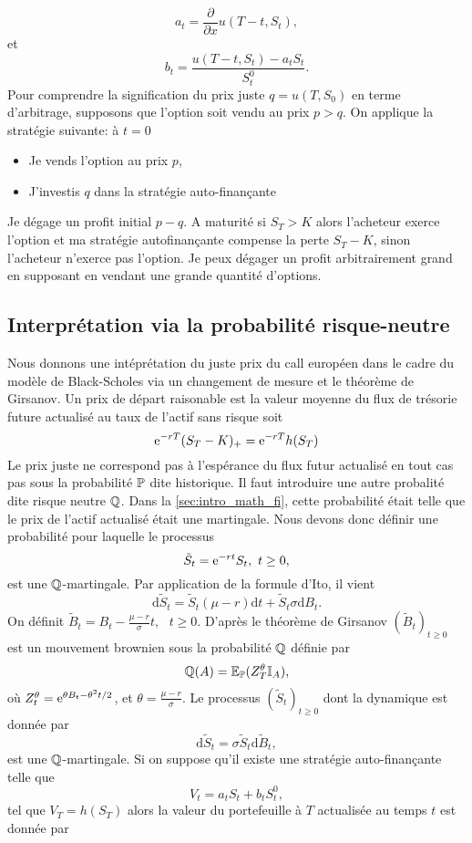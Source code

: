 $$
a_t = \frac{\partial}{\partial x}u(T-t, S_t),
$$
et 
$$
b_t = \frac{u(T-t, S_t) - a_t S_t}{S^0_t}.
$$
Pour comprendre la signification du prix juste $q = u(T, S_0)$ en terme d'arbitrage, supposons que l'option soit vendu au prix $p>q$. On applique la stratégie suivante: à $t=0$
\begin{itemize}
    \item Je vends l'option au prix $p$, 
    \item J'investis $q$ dans la stratégie auto-finançante
\end{itemize}
Je dégage un profit initial $p-q$. A maturité si $S_T> K$ alors l'acheteur exerce l'option et ma stratégie autofinançante compense la perte $S_T-K$, sinon l'acheteur n'exerce pas l'option. Je peux dégager un profit arbitrairement grand en supposant en vendant une grande quantité d'options.
\subsection{Interprétation via la probabilité risque-neutre}
Nous donnons une intéprétation du juste prix du call européen dans le cadre du modèle de Black-Scholes via un changement de mesure et le théorème de Girsanov. Un prix de départ raisonable est la valeur moyenne du flux de trésorie future actualisé au taux de l'actif sans risque soit
$$
\mathrm{e}^{-rT}(S_T - K)_+ = \mathrm{e}^{-rT}h(S_T)
$$
Le prix juste ne correspond pas à l'espérance du flux futur actualisé en tout cas pas sous la probabilité $\mathbb{P}$ dite historique. Il faut introduire une autre probalité dite risque neutre $\mathbb{Q}$. Dans la \cref{sec:intro_math_fi}, cette probabilité était telle que le prix de l'actif actualisé était une martingale. Nous devons donc définir une probabilité pour laquelle le processus 
$$
\tilde{S}_t = \mathrm{e}^{-rt}S_t,\text{ }t\geq 0,
$$
est une $\mathbb{Q}$-martingale. Par application de la formule d'Ito, il vient 
$$
\text{d}\tilde{S}_t = \tilde{S}_t (\mu- r)\text{d}t + \tilde{S}_t \sigma\text{d}B_t.
$$
On définit $\tilde{B}_t = B_t - \frac{\mu - r}{\sigma}t,\text{ }t\geq0$. D'après le théorème de Girsanov $(\tilde{B}_t)_{t\geq 0}$ est un mouvement brownien sous la probabilité $\mathbb{Q}$ définie par 
$$
\mathbb{Q}(A) = \mathbb{E}_{\mathbb{P}}(Z_T^\theta\mathbb{I}_A),
$$
où $Z_t^\theta = \mathrm{e}^{\theta B_t  - \theta^2 t/2}$, et $\theta = \frac{\mu - r}{\sigma}.$ Le processus $(\tilde{S}_t)_{t\geq 0}$ dont la dynamique est donnée par 
$$
\text{d}\tilde{S}_t = \sigma\tilde{S}_t\text{d}\tilde{B}_t,
$$
est une $\mathbb{Q}$-martingale. Si on suppose qu'il existe une stratégie auto-finançante telle que 
$$
V_t = a_t S_t + b_tS_t^0,
$$
tel que $V_T = h(S_T)$ alors la valeur du portefeuille à $T$ actualisée au temps $t$ est donnée par 
